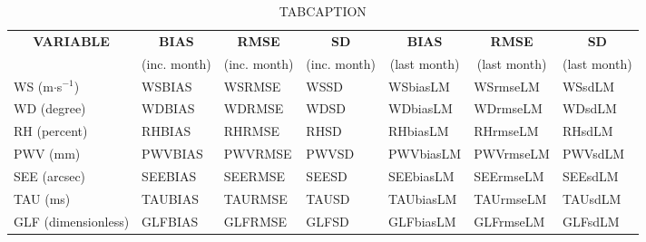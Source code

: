\begin{table}[h!]
\begin{center}
\begin{tabular}{|l|l|l|l|l|l|l|}
\hline
\multicolumn{1}{|c|}{\cellcolor[HTML]{C0C0C0}\textbf{VARIABLE}} & \multicolumn{1}{c|}{\cellcolor[HTML]{C0C0C0}\textbf{BIAS}} & \multicolumn{1}{c|}{\cellcolor[HTML]{C0C0C0}\textbf{RMSE}} & \multicolumn{1}{c|}{\cellcolor[HTML]{C0C0C0}\textbf{SD}} & \multicolumn{1}{c|}{\cellcolor[HTML]{C0C0C0}\textbf{BIAS}} & \multicolumn{1}{c|}{\cellcolor[HTML]{C0C0C0}\textbf{RMSE}} & \multicolumn{1}{c|}{\cellcolor[HTML]{C0C0C0}\textbf{SD}}\\
\multicolumn{1}{|c|}{\cellcolor[HTML]{C0C0C0}} & \multicolumn{1}{c|}{\cellcolor[HTML]{C0C0C0}(inc. month)} & \multicolumn{1}{c|}{\cellcolor[HTML]{C0C0C0}(inc. month)} & \multicolumn{1}{c|}{\cellcolor[HTML]{C0C0C0}(inc. month)} & \multicolumn{1}{c|}{\cellcolor[HTML]{C0C0C0}(last month)} & \multicolumn{1}{c|}{\cellcolor[HTML]{C0C0C0}(last month)} & \multicolumn{1}{c|}{\cellcolor[HTML]{C0C0C0}(last month)}\\\hline
\cellcolor[HTML]{C0C0C0}WS (m$\cdot$s$^{-1}$) & WSBIAS  & WSRMSE  & WSSD  & WSbiasLM     & WSrmseLM     & WSsdLM\\
\cellcolor[HTML]{C0C0C0}WD (degree)           & WDBIAS  & WDRMSE  & WDSD  & WDbiasLM     & WDrmseLM     & WDsdLM\\
\cellcolor[HTML]{C0C0C0}RH (percent)          & RHBIAS  & RHRMSE  & RHSD  & RHbiasLM     & RHrmseLM     & RHsdLM\\
\cellcolor[HTML]{C0C0C0}PWV (mm)              & PWVBIAS & PWVRMSE & PWVSD & PWVbiasLM    & PWVrmseLM    & PWVsdLM\\
\cellcolor[HTML]{C0C0C0}SEE (arcsec)          & SEEBIAS & SEERMSE & SEESD & SEEbiasLM    & SEErmseLM    & SEEsdLM\\
\cellcolor[HTML]{C0C0C0}TAU (ms)              & TAUBIAS & TAURMSE & TAUSD & TAUbiasLM    & TAUrmseLM    & TAUsdLM\\
\cellcolor[HTML]{C0C0C0}GLF (dimensionless)   & GLFBIAS & GLFRMSE & GLFSD & GLFbiasLM    & GLFrmseLM    & GLFsdLM\\
\hline
\end{tabular}
\caption{TABCAPTION}
\end{center}
\end{table}

